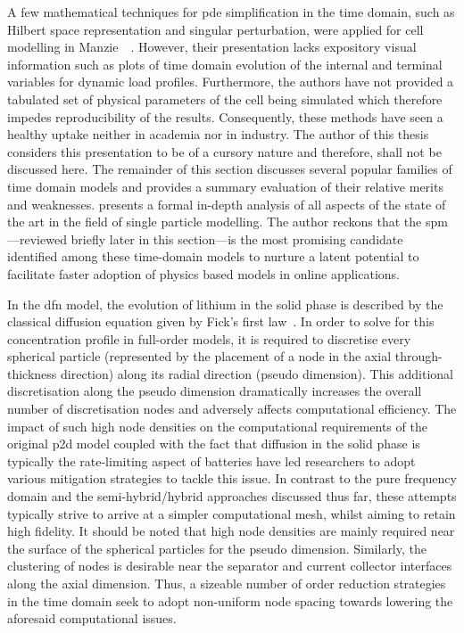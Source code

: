 A few mathematical  techniques for \gls{pde} simplification in  the time domain,
such as Hilbert space representation and singular perturbation, were applied for
cell  modelling in  Manzie~\etal~\cite{Manzie2015}. However,  their presentation
lacks expository  visual information such as  plots of time domain  evolution of
the internal and terminal variables  for dynamic load profiles. Furthermore, the
authors  have  not provided  a  tabulated  set  of  physical parameters  of  the
cell being  simulated which  therefore impedes  reproducibility of  the results.
Consequently, these methods  have seen a healthy uptake neither  in academia nor
in industry. The  author of this thesis  considers this presentation to  be of a
cursory  nature  and therefore,  shall  not  be  discussed here.  The  remainder
of  this  section discusses  several  popular  families  of time  domain  models
and  provides a  summary evaluation  of  their relative  merits and  weaknesses.
 presents a formal in-depth  analysis of all aspects of the
state of the art  in the field of single particle  modelling. The author reckons
that  the  \gls{spm}---reviewed briefly  later  in  this section---is  the  most
promising  candidate identified  among  these time-domain  models  to nurture  a
latent potential to facilitate faster adoption of physics based models in online
applications.



In the \gls{dfn} model, the evolution of lithium in the solid phase is described
by the classical  diffusion equation given by  Fick's first law~\cite{Fick1995}.
In order  to solve for  this concentration profile  in full-order models,  it is
required to discretise every spherical particle (represented by the placement of
a  node  in  the  axial  \ie{} through-thickness  direction)  along  its  radial
direction (pseudo  dimension). This  additional discretisation along  the pseudo
dimension dramatically increases the overall  number of discretisation nodes and
adversely  affects  computational  efficiency.  The impact  of  such  high  node
densities  on the  computational requirements  of the  original \gls{p2d}  model
coupled  with the  fact  that diffusion  in  the solid  phase  is typically  the
rate-limiting  aspect  of  batteries  have  led  researchers  to  adopt  various
mitigation strategies  to tackle this issue.  In contrast to the  pure frequency
domain and the semi-hybrid/hybrid approaches  discussed thus far, these attempts
typically strive  to arrive at  a simpler  computational mesh, whilst  aiming to
retain high  fidelity. It should  be noted that  high node densities  are mainly
required near the  surface of the spherical particles for  the pseudo dimension.
Similarly, the clustering  of nodes is desirable near the  separator and current
collector interfaces along the axial dimension. Thus, a sizeable number  of order reduction strategies
in the time  domain seek to adopt non-uniform node  spacing towards lowering the
aforesaid computational issues.

